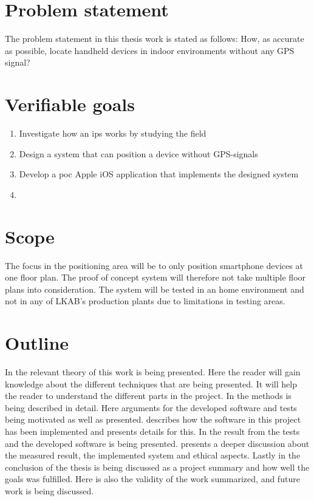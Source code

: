 \section{Problem statement}\label{sec:introProblemStatement}
The problem statement in this thesis work is stated as follows: How, as accurate as possible, locate handheld devices in indoor environments without any GPS signal?

\section{Verifiable goals}\label{sec:introGoals}
\begin{enumerate}
	\item \label{goal:fieldInvestigation}
	Investigate how an \acrfull{ips} works by studying the field

	\item \label{goal:systemDesign}
	Design a system that can position a device without GPS-signals

	\item \label{goal:poc}
	Develop a \acrfull{poc} Apple iOS application that implements the designed system

	\item \label{goal:systemEvaluation}
\end{enumerate}


\section{Scope}
The focus in the positioning area will be to only position smartphone devices at one floor plan.
The proof of concept system will therefore not take multiple floor plans into consideration.
The system will be tested in an home environment and not in any of LKAB's production plants due to
limitations in testing areas.


\section{Outline}
In  the relevant theory of this work is being presented.
Here the reader will gain knowledge about the different techniques that are being presented.
It will help the reader to understand the  different parts in the project.
In  the methods is being described in detail.
Here arguments for the developed software and tests being motivated as well as presented.
 describes how the software in this project has been implemented and presents details for this.
In  the result from the tests and the developed software is being presented.
 presents a deeper discussion about the measured result, the implemented system and ethical aspects.
Lastly in  the conclusion of the thesis is being discussed as a project summary and how well the goals was fulfilled.
Here is also the validity of the work summarized, and future work is being discussed.

